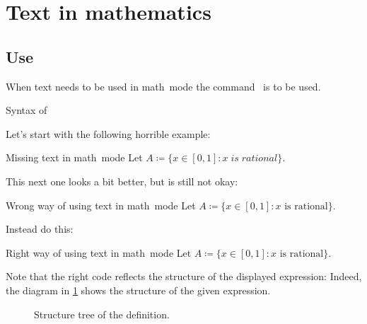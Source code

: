 \section{Text in mathematics}


\subsection{Use }

When text needs to be used in math~mode the command~ is to be used.
\begin{showcode}{Syntax of }
\end{showcode}
Let’s start with the following horrible example:
\begin{showlatex}{Missing text in math~mode}
Let $A \coloneqq \{ x \in [0,1] : x \; is \; rational \}$.
\end{showlatex}
This next one looks a bit better, but is still not okay:
\begin{showlatex}[label = {wrong math mode position}]{Wrong way of using text in math~mode}
Let $A \coloneqq \{ x \in [0,1] : x \text{ is rational} \}$.
\end{showlatex}
Instead do this:
\begin{showlatex}[label = {right math mode position}]{Right way of using text in math~mode}
Let $A \coloneqq \{ x \in [0,1] : \text{$x$ is rational} \}$.
\end{showlatex}
Note that the right code reflects the structure of the displayed expression:
Indeed, the diagram in \cref{structure tree of definition} shows the structure of the given expression.
\begin{figure}[tb]
  \begin{center}
  \end{center}
  \caption{Structure tree of the definition.}
  \label{structure tree of definition}
\end{figure}
